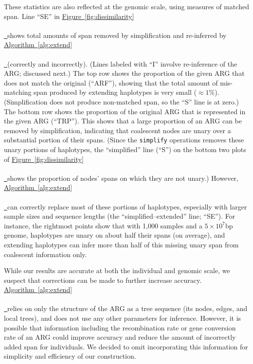 \documentclass[10pt,twoside,lineno]{gsajnl}
\newcommand{\algorithmref}[2][]{%
	\hyperref[{#2}]{%
		Algorithm~\ref*{#2}%
		\ifx\\#1\\%
		\else
		\,#1%
		\fi
	}%
}
\newcommand*{\figref}[2][]{%
	\hyperref[{#2}]{%
		Figure~\ref*{#2}%
		\ifx\\#1\\%
		\else
		\,#1%
		\fi
	}%
}
\begin{document}
These statistics are also reflected at the genomic scale, using measures of matched span.
Line ``SE'' in \figref{fig:dissimilarity} shows total amounts of span removed by simplification
and re-inferred by \algorithmref{alg:extend} (correctly and incorrectly).
(Lines labeled with ``I'' involve re-inference of the ARG; discussed next.)
The top row shows the proportion of the given ARG that does not match the original (``ARF''),
showing that the total amount of mis-matching span
produced by extending haplotypes is very small ($\approx 1\%$).
(Simplification does not produce non-matched span, so the ``S'' line is at zero.)
The bottom row shows the proportion of the original ARG that is represented in the given ARG (``TRP'').
This shows that a large proportion of an ARG can be removed by simplification,
indicating that coalescent nodes are unary
over a substantial portion of their spans.
(Since the \texttt{simplify} operations removes these unary portions of haplotypes,
the ``simplified'' line (``S'') on the bottom two plots of \figref{fig:dissimilarity} shows
the proportion of nodes' spans on which they are not unary.)
However, \algorithmref{alg:extend} can correctly replace most of these portions of haplotypes,
especially with larger sample sizes and sequence lengths
(the ``simplified--extended'' line; ``SE'').
For instance, the rightmost points show that
with 1,000 samples and a $5 \times 10^7$bp genome,
haplotypes are unary on about half their spans (on average),
and extending haplotypes can infer more than half of this missing unary span from coalescent information only.

While our results are accurate at both the individual and genomic scale, 
we suspect that corrections can be made to further increase accuracy. 
\algorithmref{alg:extend} relies on only the structure of the ARG as a tree sequence (its nodes, edges, and local trees), 
and does not use any other parameters for inference.
However, it is possible that information including the recombination rate or gene conversion rate of an ARG could improve 
accuracy and reduce the amount of incorrectly added span for individuals.
We decided to omit incorporating this information for simplicity and efficiency of our construction.
\end{document}
